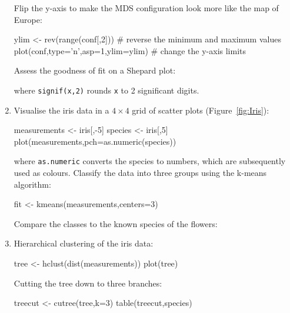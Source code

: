 \begin{enumerate}
Flip the y-axis to make the MDS configuration look more like the map
of Europe:

\begin{script}[firstnumber=4]
ylim <- rev(range(conf[,2])) # reverse the minimum and maximum values
plot(conf,type='n',asp=1,ylim=ylim) # change the y-axis limits
\end{script}

Assess the goodness of fit on a Shepard plot:


\noindent where \texttt{signif(x,2)} rounds \texttt{x} to 2
significant digits.

\item\label{it:R-kmeans} Visualise the iris data in a ${4}$
  grid of scatter plots (Figure~\ref{fig:Iris}):

\begin{script}
measurements <- iris[,-5]
species <- iris[,5]
plot(measurements,pch=as.numeric(species))
\end{script}

\noindent where \texttt{as.numeric} converts the species to numbers,
which are subsequently used as colours. Classify the data into three
groups using the k-means algorithm:

\begin{script}[firstnumber=4]
fit <- kmeans(measurements,centers=3)
\end{script}

Compare the classes to the known species of the flowers:


\item Hierarchical clustering of the iris data:

\begin{script}
tree <- hclust(dist(measurements))
plot(tree)
\end{script}

Cutting the tree down to three branches:

\begin{script}
treecut <- cutree(tree,k=3)
table(treecut,species)
\end{script}

\end{enumerate}

